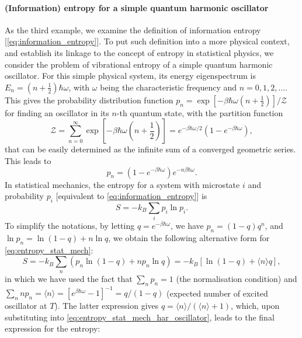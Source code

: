 \paragraph{\textbf{(Information) entropy for a simple quantum harmonic oscillator}}
As the third example, we examine the definition of information entropy [\cref{eq:information_entropy}]. To put such definition into a more physical context, and establish its linkage to the concept of entropy in statistical physics, we consider the problem of vibrational entropy of a simple quantum harmonic oscillator. For this simple physical system, its energy eigenspectrum is $E_n=\left(n+\frac{1}{2}\right)\hbar\omega$, with $\omega$ being the characteristic frequency and $n=0,1,2,\ldots$. This gives the probability distribution function $p_n=\exp\left[-\beta\hbar\omega \left(n+\frac{1}{2}\right)\right]/\mathcal{Z}$ for finding an oscillator in its $n$-th quantum state, with the partition function 
\begin{equation*}
    \mathcal{Z}=\sum_{n=0}^{\infty}\exp\left[-\beta\hbar\omega \left(n+\frac{1}{2}\right)\right]=e^{-\beta\hbar\omega/2}\left(1-e^{-\beta\hbar\omega}\right),
\end{equation*}
that can be easily determined as the infinite sum of a converged geometric series. This leads to
\begin{equation*}
    p_n =\left(1-e^{-\beta\hbar\omega}\right)e^{-n\beta\hbar\omega}.
\end{equation*}
In statistical mechanics, the entropy for a system with microstate $i$ and probability $p_i$ [equivalent to \cref{eq:information_entropy}] is 
\begin{equation}
    \label{eq:entropy_stat_mech}
    S=-k_B\sum_i p_i\ln p_i.
\end{equation}
To simplify the notations, by letting $q=e^{-\beta\hbar\omega}$, we have $p_n=(1-q)q^n$, and $\ln p_n=\ln(1-q)+n\ln q$, we obtain the following alternative form for \cref{eq:entropy_stat_mech}:
\begin{equation}
    \label{eq:entropy_stat_mech_har_oscillator}
    S=-k_B\sum_n \left(p_n\ln (1-q)+np_n\ln q\right)=-k_B[\ln(1-q)+\langle n\rangle q],
\end{equation}
in which we have used the fact that $\sum_n p_n=1$ (the normalisation condition) and $\sum_n np_n=\langle n\rangle =\left[e^{\beta\hbar\omega}-1\right]^{-1}=q/(1-q)$ (expected number of excited oscillator at $T$). The latter expression gives $q=\langle n\rangle/(\langle n\rangle +1)$, which, upon substituting into \cref{eq:entropy_stat_mech_har_oscillator}, leads to the final expression for the entropy:
